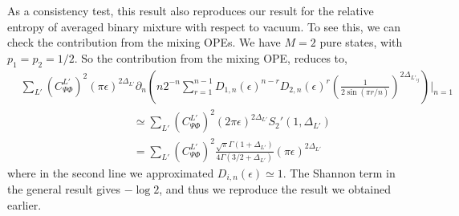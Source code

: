 \documentclass[11pt]{article}
\newcommand{\ep}{\epsilon}
\newcommand{\p}{\partial}
\newcommand{\nn}{\nonumber}
\newcommand{\lb}{\left(}
\newcommand{\rb}{\right)}
\begin{document}
As a consistency test, this result also reproduces our result for the relative entropy of averaged binary mixture with respect to vacuum. To see this, we can check the contribution from the mixing OPEs. We have $M=2$ pure states, with $p_1 = p_2 = 1/2$. So the contribution from the mixing OPE, reduces to,
\begin{align}
    &\sum_{L'}{(C_{\Psi \Phi}^{L'})}^2 (\pi \ep)^{2\Delta_{L'}}\p_n \lb n2^{-n}  \sum_{r=1}^{n-1}D_{1,n}(\ep)^{n-r}D_{2,n}(\ep)^r \lb\frac{1}{2\sin (\pi r/n)}\rb^{2\Delta_{L'_{ij}}}\rb\Bigg|_{n=1} \nn\\
    &\qquad\qquad\qquad\qquad \qquad\simeq\sum_{L'}{(C_{\Psi\Phi}^{L'})}^2 (2\pi \ep)^{2\Delta_{L'}} S_2'(1,\Delta_{L'}) \\
    &\qquad\qquad\qquad\qquad \qquad= \sum_{L'}{(C_{\Psi\Phi}^{L'})}^2\frac{\sqrt{\pi }\Gamma(1+\Delta_{L'})}{4\Gamma(3/2+\Delta_{L'})}(\pi \ep)^{2\Delta_{L'}}
\end{align}
where in the second line we approximated $D_{i,n}(\ep)\simeq 1$. 
The Shannon term in the general result gives $-\log 2$, and thus we reproduce the result we obtained earlier. 
\end{document}
